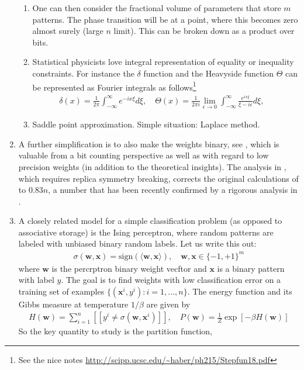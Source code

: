 \documentclass[10pt,a4pape]{article}
\newcommand{\w}{{\mathbf w}}
\newcommand{\x}{{\mathbf x}}
\begin{document}
\begin{enumerate}
\begin{enumerate}
\item One can then consider the fractional volume of parameters that store $m$ patterns. The phase transition will be at a point, where this becomes zero almost surely (large $n$ limit). This can be broken down as a product over bits. 
\item Statistical physicists love integral representation of equality or inequality constraints. For instance the $\delta$ function and the Heavyside function $\Theta$ can be represented as Fourier integrals as follows\footnote{See the nice notes \url{http://scipp.ucsc.edu/\~haber/ph215/Stepfun18.pdf}}
\begin{align}
\delta(x) =\frac 1 {2\pi} \int_{-\infty}^{\infty}  e^{-i x \xi} d\xi, \quad 
\Theta(x) = \frac{1}{2\pi i} \lim_{\epsilon \to 0} \int_{-\infty}^{\infty} \frac{e^{i x \xi}}{\xi - i \epsilon }  d\xi, \quad 
\end{align}
\item Saddle point approximation. Simple situation: Laplace method. 
\end{enumerate}
% 
\item A further simplification is to also make the weights binary, see \cite{krauth1989storage}, which is valuable from a bit counting perspective as well as with regard to low precision weights (in addition to the theoretical insights). The analysis in \cite{krauth1989storage}, which requires replica symmetry breaking, corrects the original calculations of  \cite{gardner1988optimal} to $0.83n$, a number that has been recently confirmed by a rigorous analysis in \cite{ding2018capacity}. 
\item A closely related model for a simple classification problem (as opposed to associative storage) is the Ising perceptron, where random patterns are labeled with unbiased binary random labels. Let us write this out:
\begin{align}
\sigma(\w,\x) = \text{sign}(\langle \w,\x\rangle), \quad \w,\x \in \{-1,+1\}^m 
\end{align}
where $\w$ is the percrptron binary weight vecftor and $\x$ is a binary pattern with label $y$. The goal is to find weights with low classification error on a training set of examples $\{(\x^i,y^i): i=1,\dots,n\}$. The energy function and its Gibbs measure at temperature $1/\beta$ are given by
\begin{align}
H(\w) = \sum_{i=1}^n [[ y^i \neq \sigma(\w,\x^i)]], \quad P(\w) = \frac 1Z \exp\left[-\beta H(\w) \right]
\end{align}
So the key quantity to study is the partition function,

\end{enumerate}
\end{document}
